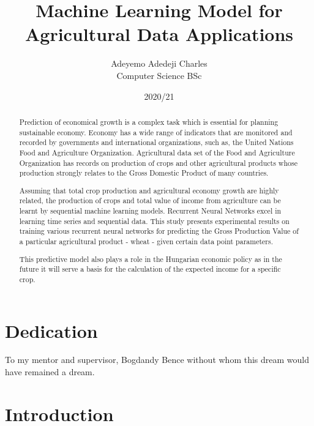 \documentclass[
]{thesis-ekf}
\begin{document}
	
	
\title{Machine Learning Model for Agricultural Data Applications}
\author{Adeyemo Adedeji Charles\\Computer Science BSc}
	
\date{2020/21}
\maketitle



\begin{abstract}
	Prediction of economical growth is a complex task which is essential for planning sustainable economy.	
	Economy has a wide range of indicators that are monitored and recorded by governments and international organizations, such as, the United Nations Food and Agriculture Organization.	
	Agricultural data set of the Food and Agriculture Organization has records on production of crops and other agricultural products whose production strongly relates to the Gross Domestic Product of many countries.
	
	
	Assuming that total crop production and agricultural economy growth are highly related, the production of crops and total value of income from agriculture can be learnt by sequential machine learning models.
	Recurrent Neural Networks excel in learning time series and sequential data. 
	This study presents experimental results on training various recurrent neural networks for predicting the Gross Production Value of a particular agricultural product - wheat - given certain data point parameters. 
	
	This predictive model also plays a role in the Hungarian economic policy as in the future it will serve a basis for the calculation of the expected income for a specific crop.
\end{abstract}

\chapter*{Dedication}

To my mentor and supervisor, Bogdandy Bence without whom this dream would have remained a dream. 

\tableofcontents

\chapter*{Introduction}
\end{document}
